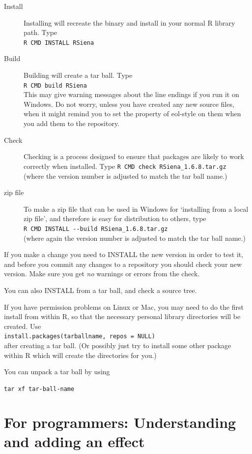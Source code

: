 \documentclass[a4paper,fleqn,11pt]{article}
\newcommand{\+}{\, + \,}
\begin{document}
\begin{description}
\item[Install] Installing will recreate the binary and install in your normal R
  library path. Type\\
\verb|R CMD INSTALL RSiena|
\item[Build] Building will create a tar ball. Type\\
\verb|R CMD build RSiena|\\
This may give warning messages about the line endings if you run it on
Windows. Do not worry, unless you have created any new source files, when it
might remind you to set the property of \textsf{eol-style} on them when you add
them to the repository.
\item [Check] Checking is a process designed to ensure that packages are likely
  to work correctly when installed. Type
\verb|R CMD check RSiena_1.6.8.tar.gz|\\
(where the version number is adjusted to match the tar ball name.)
\item[zip file] To make a zip file that can be used in Windows for
`installing from a local zip file', and therefore is easy for distribution
to others, type\\
\verb|R CMD INSTALL --build RSiena_1.6.8.tar.gz| \\
(where again the version number is adjusted to match the tar ball name.)
\end{description}

If you make a change you need to \textsf{INSTALL} the new version in order to
test it, and before you commit any changes to a repository you should
\textsf{check} your new version. Make sure you get \emph{no} warnings or
errors from the check.

You can also \textsf{INSTALL} from a tar ball, and \textsf{check} a source
tree.

If you have permission problems on Linux or Mac, you may need to do the first
install from within \textsf{R}, so that the necessary personal library
directories will be created. Use\\
\verb|install.packages(tarballname, repos = NULL)| \\after creating a tar
ball. (Or possibly just try to install some other package within R which will
create the directories for you.)

You can unpack a tar ball by using

\verb|tar xf tar-ball-name|

\section{For programmers: Understanding and adding an effect}
\end{document}
